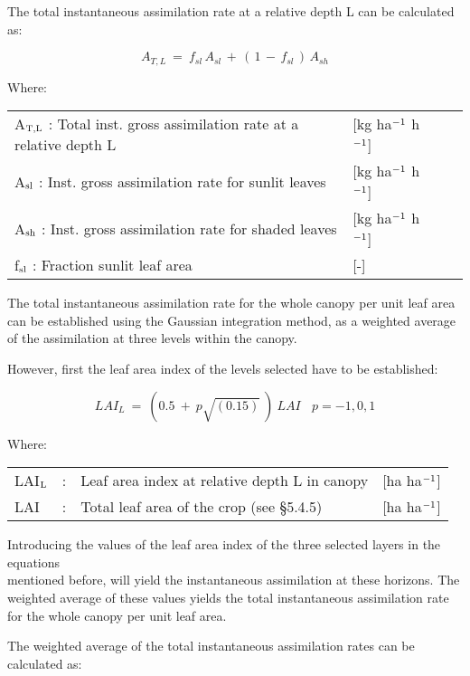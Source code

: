 The total instantaneous assimilation rate at a relative depth L can be calculated as:

\begin{equation}
A _{T,L} ~=~ f _{sl} \, A _{sl} \, +\, (\, 1\, -\, f _{sl} \, )\, A _{sh} 
\end{equation}

Where:\\
\begin{tabularx}{\textwidth}{llXr}
A$_{{\rm T,L}}$ : Total inst. gross assimilation rate at a relative depth L   &
     [kg ha$^{{\rm -1}}$ h$^{{\rm -1}}$]\\
A$_{{\rm sl}}$ : Inst. gross assimilation rate for sunlit leaves  & [kg ha$^{{\rm -1}}$ h$^{{\rm -1}}$]\\
A$_{{\rm sh}}$ : Inst. gross assimilation rate for shaded leaves  & [kg ha$^{{\rm -1}}$ h$^{{\rm -1}}$]\\
f$_{{\rm sl}}$ : Fraction sunlit leaf area  &  [-]\\
\end{tabularx}

The total instantaneous assimilation rate for the whole canopy per unit leaf area can be
established using the Gaussian integration method, as a weighted average of the assimila\-tion at three levels within the canopy.

However, first the leaf area index of the levels selected have to be established:

\begin{equation}
LAI _{L} ~=~ (0.5~+~p \sqrt{(0.15)} ~)~LAI~~~~p=-1,0,1
\end{equation}

Where:\\
\begin{tabularx}{\textwidth}{llXr}
LAI$_{{\rm L}}$ &:& Leaf area index at relative depth L in canopy    &    [ha ha$^{{\rm -1}}$]\\
LAI &:& Total leaf area of the crop    (see \S 5.4.5) &   [ha ha$^{{\rm -1}}$]\\
\end{tabularx}

Introducing the values of the leaf area index of the three selected layers in the equations\\
mentioned before, will yield the instantaneous assimilation at these horizons. The
weighted average of these values yields the total instantaneous assimilation rate for the
whole canopy per unit leaf area.

The weighted average of the total instanta\-neous assimilation rates can be calculated as:

